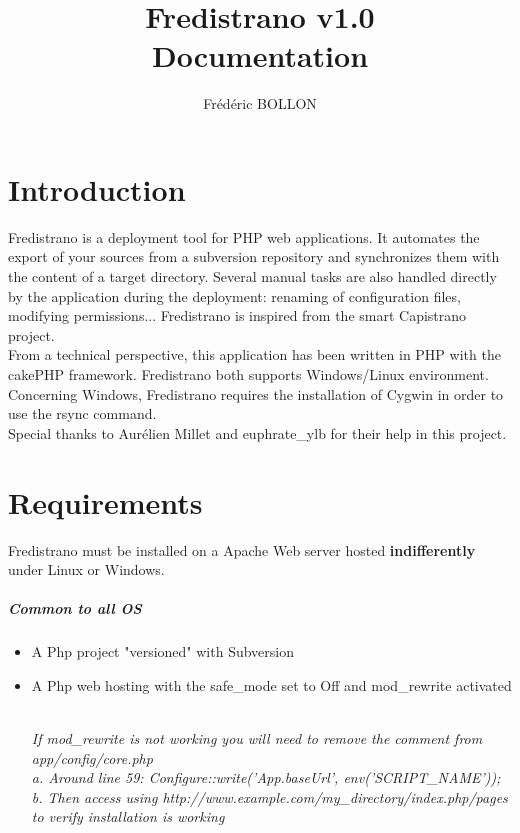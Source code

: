 \documentclass[12pt,a4paper]{report}
\author{Frédéric BOLLON}
\title{Fredistrano v1.0\\Documentation\\}
\begin{document}
\maketitle
\tableofcontents

\chapter{Introduction}
Fredistrano is a deployment tool for PHP web applications. It automates the export of your sources from a subversion repository and synchronizes them with the content of a target directory. Several manual tasks are also handled directly by the application during the deployment: renaming of configuration files, modifying permissions... Fredistrano is inspired from the smart Capistrano project.\\

From a technical perspective, this application has been written in PHP with the cakePHP framework. Fredistrano both supports Windows/Linux environment. Concerning Windows, Fredistrano requires the installation of Cygwin in order to use the rsync command.\\

Special thanks to Aurélien Millet and euphrate\_ylb for their help in this project.

\chapter{Requirements}
Fredistrano must be installed on a Apache Web server hosted \textbf{indifferently} under Linux or Windows.
\paragraph*{Common to all OS}
\begin{itemize}
\item 
A Php project "versioned" with Subversion
\item 
A Php web hosting with the safe\_mode set to Off and mod\_rewrite activated\\\\
\begin{small}\textit{If mod\_rewrite is not working you will need to remove the comment from app/config/core.php\\
      a. Around line 59: Configure::write('App.baseUrl', env('SCRIPT\_NAME'));\\
      b. Then access using http://www.example.com/my\_directory/index.php/pages to verify installation is working}\end{small}
\end{itemize}
\end{document}
